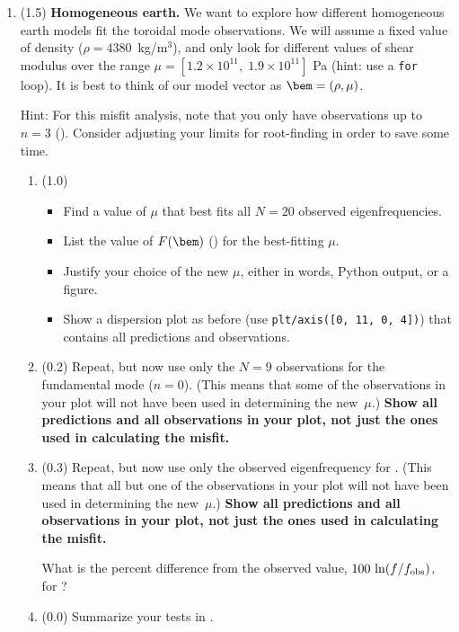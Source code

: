\documentclass[11pt,titlepage,fleqn]{article}
\begin{document}
\begin{enumerate}
\item (1.5) {\bf Homogeneous earth.} We want to explore how different homogeneous earth models fit the toroidal mode observations. We will assume a fixed value of density ($\rho = 4380$~kg/m$^3$), and only look for different values of shear modulus over the range $\mu = [1.2\times 10^{11},\; 1.9 \times 10^{11}]$ Pa (hint: use a {\tt for} loop). It is best to think of our model vector as $\bem = (\rho, \mu)$.

Hint: For this misfit analysis, note that you only have observations up to $n = 3$ (). Consider adjusting your limits for root-finding in order to save some time.

\begin{enumerate}
\item (1.0)
\begin{itemize}
\item Find a value of $\mu$ that best fits all $N=20$ observed eigenfrequencies.
\item List the value of $F(\bem)$ () for the best-fitting $\mu$.
\item Justify your choice of the new $\mu$, either in words, Python output, or a figure.
\item Show a dispersion plot as before (use \verb+plt/axis([0, 11, 0, 4])+) that contains all predictions and observations.
\end{itemize}

\item (0.2) Repeat, but now use only the $N = 9$ observations for the fundamental mode ($n=0$). (This means that some of the observations in your plot will not have been used in determining the new~$\mu$.)
{\bf Show all predictions and all observations in your plot, not just the ones used in calculating the misfit.}

\item (0.3) Repeat, but now use only the observed eigenfrequency for . (This means that all but one of the observations in your plot will not have been used in determining the new~$\mu$.)
{\bf Show all predictions and all observations in your plot, not just the ones used in calculating the misfit.}

What is the percent difference from the observed value, $100\,\ln(f/f_{\rm obs})$, for ?

\item (0.0) Summarize your tests in .
\end{enumerate}


\end{enumerate}
\end{document}
